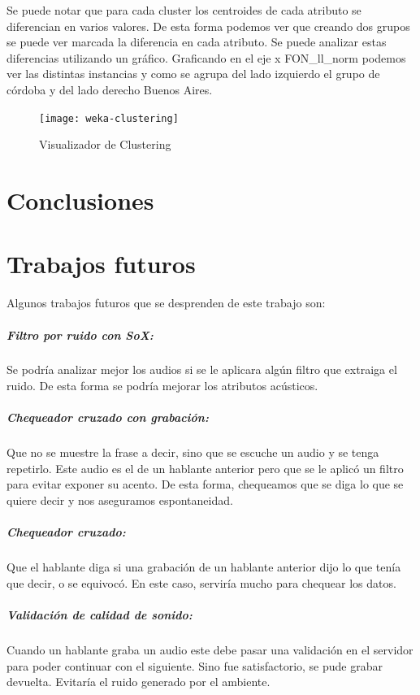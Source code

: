 \documentclass[11pt,a4paper,twoside]{tesis}
\begin{document}
Se puede notar que para cada cluster los centroides de cada atributo se diferencian en varios valores. De esta forma podemos ver que creando dos grupos se puede ver marcada la diferencia en cada atributo. Se puede analizar estas diferencias utilizando un gráfico. Graficando en el eje x FON\_ll\_norm podemos ver las distintas instancias y como se agrupa del lado izquierdo el grupo de córdoba y del lado derecho Buenos Aires.

\begin{figure}[h!]
    \centerline{\texttt{[image: weka-clustering]} }
    \caption{Visualizador de Clustering}
    \label{click_final}
\end{figure}
 
\chapter{Conclusiones}
\chapter{Trabajos futuros}

Algunos trabajos futuros que se desprenden de este trabajo son:

\paragraph*{Filtro por ruido con SoX:} Se podría analizar mejor los audios si se le aplicara algún filtro que extraiga el ruido. De esta forma se podría mejorar los atributos acústicos. 

\paragraph*{Chequeador cruzado con grabación:} Que no se muestre la frase a decir, sino que se escuche un audio y se tenga repetirlo. Este audio es el de un hablante anterior pero que se le aplicó un filtro para evitar exponer su acento. De esta forma, chequeamos que se diga lo que se quiere decir y nos aseguramos espontaneidad.

\paragraph*{Chequeador cruzado:} Que el hablante diga si una grabación de un hablante anterior dijo lo que tenía que decir, o se equivocó. En este caso, serviría mucho para chequear los datos. 

\paragraph*{Validación de calidad de sonido:} Cuando un hablante graba un audio este debe pasar una validación en el servidor para poder continuar con el siguiente. Sino fue satisfactorio, se pude grabar devuelta. Evitaría el ruido generado por el ambiente. 
\end{document}
